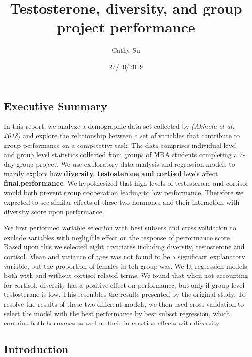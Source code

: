 \documentclass[]{article}
\title{Testosterone, diversity, and group project performance}
\author{Cathy Su}
\date{27/10/2019}
\begin{document}
\maketitle

\subsection{Executive Summary}\label{executive-summary}

In this report, we analyze a demographic data set collected by
\emph{(Akinola et al. 2018)} and explore the relationship between a set
of variables that contribute to group performance on a competetive task.
The data comprises individual level and group level statistics collected
from groups of MBA students completing a 7-day group project. We use
exploratory data analysis and regression models to mainly explore how
\textbf{diversity, testosterone and cortisol} levels affect
\textbf{final.performance}. We hypothesized that high levels of
testosterone and cortisol would both prevent group cooperation leading
to low performance. Therefore we expected to see similar effects of
these two hormones and their interaction with diversity score upon
performance.

We first performed variable selection with best subsets and cross
validation to exclude variables with negligible effect on the response
of performance score. Based upon this we selected eight covariates
including diversity, testosterone and cortisol. Mean and variance of
ages was not found to be a significant explanatory variable, but the
proportion of females in teh group was. We fit regression models both
with and without cortisol related terms. We found that when not
accounting for cortisol, diversity has a positive effect on performance,
but only if group-level testosterone is low. This resembles the results
presented by the original study. To resolve the results of these two
different models, we then used cross validation to select the model with
the best performance by best subset regression, which contains both
hormones as well as their interaction effects with diversity.

\subsection{Introduction}\label{introduction}
\end{document}
